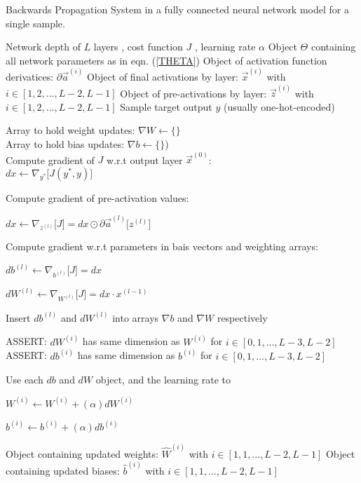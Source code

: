 \documentclass[12pt,letterpaper]{article}
\begin{document}
\begin{algorithm}
\label{back-prop}
\caption{Backwards Propagation System in a fully connected neural network model for a single sample.}
\begin{algorithmic}

\REQUIRE Network depth of $L$ layers ,  cost function $J$ , learning rate $\alpha$
\REQUIRE Object $\Theta$ containing all network parameters as in eqn. (\ref{THETA})
\REQUIRE Object of activation function derivatices: $\partial\vec{a}^{(i)}$ 
\REQUIRE Object of final activations by layer: $\vec{x}^{(i)}$ with $i \in [1,2,...,L-2,L-1]$
\REQUIRE Object of pre-activations by layer: $\vec{z}^{(i)}$ with $i \in [1,2,...,L-2,L-1]$
\REQUIRE Sample target output $y$ (usually one-hot-encoded)

Array to hold weight updates: $\nabla W \leftarrow \big\{ \big\}$ \\
Array to hold bias updates: $\nabla b \leftarrow \big\{ \big\}$) \\
Compute gradient of $J$ w.r.t output layer $\vec{x}^{(0)}$: \\

$dx \leftarrow \nabla_{y^*} \big[ J(y^*,y) \big]$ \\

	\item Compute gradient of pre-activation values: 
	\item $dx \leftarrow \nabla_{z^{(l)}} \big[ J \big] = dx \odot \partial\vec{a}^{(l)}\big[ z^{(l)} \big]$
	\item Compute gradient w.r.t parameters in bais vectors and weighting arrays:
	\item $db^{(l)} \leftarrow \nabla_{b^{(l)}} \big[ J \big] = dx$
	\item $dW^{(l)} \leftarrow \nabla_{W^{(l)}} \big[ J \big] = dx \cdot x^{(l-1)}$
	\item Insert $db^{(l)}$ and $dW^{(l)}$ into arrays $\nabla b$ and $\nabla W$ respectively

\ENDFOR

ASSERT: $dW^{(i)}$ has same dimension as $W^{(i)}$ for $i \in [0,1,...,L-3,L-2]$ \\
ASSERT: $db^{(i)}$ has same dimension as $b^{(i)}$ for $i \in [0,1,...,L-3,L-2]$ \\

	\item Use each $db$ and $dW$ object, and the learning rate to 
	\item $W^{(i)} \leftarrow W^{(i)} + (\alpha) dW^{(i)}$
	\item $b^{(i)} \leftarrow b^{(i)} + (\alpha) db^{(i)}$
\ENDFOR

\RETURN Object containing updated weights: $\hat{W}^{(i)}$ with $i \in [1,1,...,L-2,L-1]$
\RETURN Object containing updated biases: $\hat{b}^{(i)}$ with $i \in [1,1,...,L-2,L-1]$

\end{algorithmic}
\end{algorithm}
\end{document}
